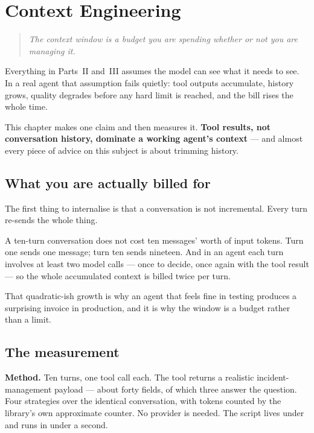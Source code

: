 \chapter{Context Engineering}
\label{ch:context}

\begin{quote}\itshape
The context window is a budget you are spending whether or not you are managing
it.
\end{quote}

\noindent
Everything in Parts~II and~III assumes the model can see what it needs to see. In
a real agent that assumption fails quietly: tool outputs accumulate, history
grows, quality degrades before any hard limit is reached, and the bill rises the
whole time.

This chapter makes one claim and then measures it. \textbf{Tool results, not
conversation history, dominate a working agent's context} --- and almost every
piece of advice on this subject is about trimming history.

\section{What you are actually billed for}
\label{sec:billed-for}

The first thing to internalise is that a conversation is not incremental. Every
turn re-sends the whole thing.

A ten-turn conversation does not cost ten messages' worth of input tokens. Turn
one sends one message; turn ten sends nineteen. And in an agent each turn
involves at least two model calls --- once to decide, once again with the tool
result --- so the whole accumulated context is billed twice per turn.

That quadratic-ish growth is why an agent that feels fine in testing produces a
surprising invoice in production, and it is why the window is a budget rather
than a limit.

\section{The measurement}
\label{sec:context-measurement}

\textbf{Method.} Ten turns, one tool call each. The tool returns a realistic
incident-management payload --- about forty fields, of which three answer the
question. Four strategies over the identical conversation, with tokens counted
by the library's own approximate counter. No provider is needed. The script
lives under  and runs in under a second.

